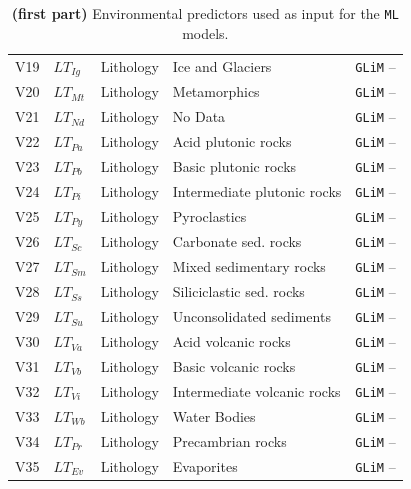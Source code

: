 \documentclass[12pt]{article}
\begin{document}
\begin{table}[t]
\begin{tabular}{p{0.5cm}p{1cm}p{2cm}p{3.5cm}p{5cm}}
V19 & $LT_{Ig}$ & Lithology & Ice and Glaciers & \texttt{GLiM}  -- \cite{hartmann2012}\\
V20 & $LT_{Mt}$ & Lithology & Metamorphics & \texttt{GLiM}  -- \cite{hartmann2012}\\
V21 & $LT_{Nd}$ & Lithology & No Data & \texttt{GLiM}  -- \cite{hartmann2012}\\
V22 & $LT_{Pa}$ & Lithology & Acid plutonic rocks & \texttt{GLiM}  -- \cite{hartmann2012}\\
V23 & $LT_{Pb}$ & Lithology & Basic plutonic rocks & \texttt{GLiM}  -- \cite{hartmann2012}\\
V24 & $LT_{Pi}$ & Lithology & Intermediate plutonic rocks & \texttt{GLiM}  -- \cite{hartmann2012}\\
V25 & $LT_{Py}$ & Lithology & Pyroclastics & \texttt{GLiM}  -- \cite{hartmann2012}\\
V26 & $LT_{Sc}$ & Lithology & Carbonate sed. rocks & \texttt{GLiM}  -- \cite{hartmann2012}\\
V27 & $LT_{Sm}$ & Lithology & Mixed sedimentary rocks & \texttt{GLiM}  -- \cite{hartmann2012}\\
V28 & $LT_{Ss}$ & Lithology & Siliciclastic sed. rocks & \texttt{GLiM}  -- \cite{hartmann2012}\\
V29 & $LT_{Su}$ & Lithology & Unconsolidated sediments & \texttt{GLiM}  -- \cite{hartmann2012}\\
V30 & $LT_{Va}$ & Lithology & Acid volcanic rocks & \texttt{GLiM}  -- \cite{hartmann2012}\\
V31 & $LT_{Vb}$ & Lithology & Basic volcanic rocks & \texttt{GLiM}  -- \cite{hartmann2012}\\
V32 & $LT_{Vi}$ & Lithology & Intermediate volcanic rocks & \texttt{GLiM}  -- \cite{hartmann2012}\\
V33 & $LT_{Wb}$ & Lithology & Water Bodies & \texttt{GLiM}  -- \cite{hartmann2012}\\
V34 & $LT_{Pr}$ & Lithology & Precambrian rocks & \texttt{GLiM}  -- \cite{hartmann2012}\\
V35 & $LT_{Ev}$ & Lithology & Evaporites & \texttt{GLiM}  -- \cite{hartmann2012}\\
\bottomrule
\end{tabular}
\caption{\textbf{(first part)} Environmental predictors used as input for the \texttt{ML} models.}
\label{tab:predictors}
\end{table}
\end{document}
